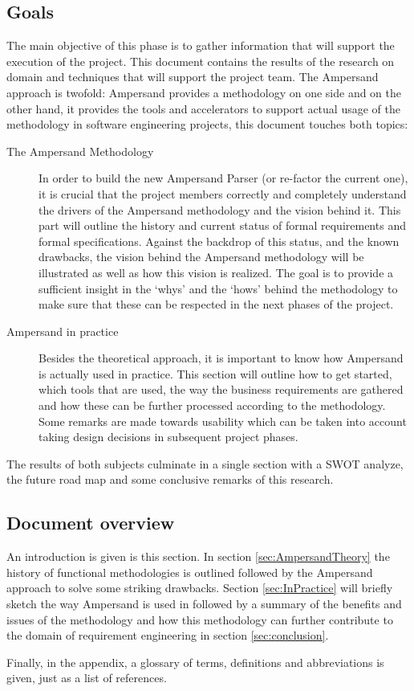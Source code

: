 \subsection{Goals}
The main objective of this phase is to gather information that will support the execution of the project.
This document contains the results of the research on domain and techniques that will support the project team.
The Ampersand approach is twofold: Ampersand provides a methodology on one side and on the other hand, it provides the tools and accelerators to support actual usage of the methodology in software engineering projects, this document touches both topics:
\begin{description}
	\item[The Ampersand Methodology]
	In order to build the new Ampersand Parser (or re-factor the current one), it is crucial that the project members correctly and completely understand the drivers of the Ampersand methodology and the vision behind it.
	This part will outline the history and current status of formal requirements and formal specifications.
	 Against the backdrop of this status, and the known drawbacks, the vision behind the Ampersand methodology will be illustrated as well as how this vision is realized.
	The goal is to provide a sufficient insight in the `whys' and the `hows' behind the methodology to make sure that these can be respected in the next phases of the project.
	
	\item[Ampersand in practice]
	Besides the theoretical approach, it is important to know how Ampersand is actually used in practice. This section will outline how to get started, which tools that are used, the way the business requirements are gathered and how these can be further processed according to the methodology. Some remarks are made towards usability which can be taken into account taking design decisions in subsequent project phases.
	
\end{description}
%
The results of both subjects culminate in a single section with a SWOT analyze, the future road map and some conclusive remarks of this research.

\subsection{Document overview}
An introduction is given is this section.
In section \autoref{sec:AmpersandTheory} the history of functional methodologies is outlined followed by the Ampersand approach to solve some striking drawbacks.
Section \autoref{sec:InPractice} will briefly sketch the way Ampersand is used in followed by a summary of the benefits and issues of the methodology and how this methodology can further contribute to the domain of requirement engineering in section \autoref{sec:conclusion}.

Finally, in the appendix, a glossary of terms, definitions and abbreviations is given, just as a list of references.
